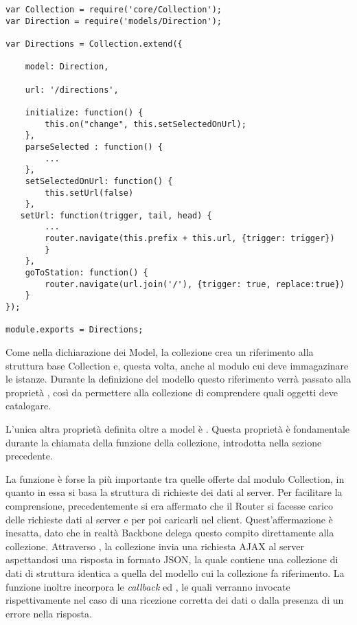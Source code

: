 \begin{lstlisting}
var Collection = require('core/Collection');
var Direction = require('models/Direction');

var Directions = Collection.extend({
    
    model: Direction,
    
    url: '/directions',
    
    initialize: function() {
        this.on("change", this.setSelectedOnUrl);
    },
    parseSelected : function() {
        ...
    },    
    setSelectedOnUrl: function() {
        this.setUrl(false)
    },
   setUrl: function(trigger, tail, head) {
        ...
        router.navigate(this.prefix + this.url, {trigger: trigger})
        }   
    },
    goToStation: function() {
        router.navigate(url.join('/'), {trigger: true, replace:true})
    }
});

module.exports = Directions;
\end{lstlisting}

Come nella dichiarazione dei Model, la collezione crea un riferimento alla struttura base Collection e, questa volta, anche al modulo cui deve immagazinare le istanze. Durante la definizione del modello questo riferimento verrà passato alla proprietà , così da permettere alla collezione di comprendere quali oggetti deve catalogare.

L'unica altra proprietà definita oltre a model è . Questa proprietà è fondamentale durante la chiamata della funzione  della collezione, introdotta nella sezione precedente.

La funzione  è forse la più importante tra quelle offerte dal modulo Collection, in quanto in essa si basa la struttura di richieste dei dati al server. Per facilitare la comprensione, precedentemente si era affermato che il Router si facesse carico delle richieste dati al server e per poi caricarli nel client. Quest'affermazione è inesatta, dato che in realtà Backbone delega questo compito direttamente alla collezione. Attraverso , la collezione invia una richiesta AJAX al server aspettandosi una risposta in formato JSON, la quale contiene una collezione di dati di struttura identica a quella del modello cui la collezione fa riferimento.
La funzione  inoltre incorpora le {\itshape callback}  ed , le quali verranno invocate rispettivamente nel caso di una ricezione corretta dei dati o dalla presenza di un errore nella risposta.

